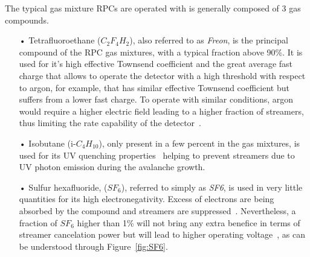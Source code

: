 	The typical gas mixture RPCs are operated with is generally composed of 3 gas compounds.
	
	\begin{itemize}
		\item[•] Tetrafluoroethane ($C_2F_4H_2$), also referred to as \textit{Freon}, is the principal compound of the RPC gas mixtures, with a typical fraction above 90\%. It is used for it's high effective Townsend coefficient and the great average fast charge that allows to operate the detector with a high threshold with respect to argon, for example, that has similar effective Townsend coefficient but suffers from a lower fast charge. To operate with similar conditions, argon would require a higher electric field leading to a higher fraction of streamers, thus limiting the rate capability of the detector~\cite{ABBRESCIA1997}.
		\item[•] Isobutane (i-$C_4H_{10}$), only present in a few percent in the gas mixtures, is used for its UV quenching properties~\cite{BATTISTONI85} helping to prevent streamers due to UV photon emission during the avalanche growth.
		\item[•] Sulfur hexafluoride, ($SF_6$), referred to simply as \textit{SF6}, is used in very little quantities for its high electronegativity. Excess of electrons are being absorbed by the compound and streamers are suppressed~\cite{ZEBALLOS98}. Nevertheless, a fraction of $SF_6$ higher than 1\% will not bring any extra benefice in terms of streamer cancelation power but will lead to higher operating voltage~\cite{CAMARRI98}, as can be understood through Figure~\ref{fig:SF6}.
	\end{itemize}
	
